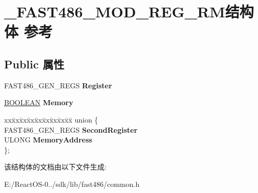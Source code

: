 \hypertarget{struct___f_a_s_t486___m_o_d___r_e_g___r_m}{}\section{\+\_\+\+F\+A\+S\+T486\+\_\+\+M\+O\+D\+\_\+\+R\+E\+G\+\_\+\+R\+M结构体 参考}
\label{struct___f_a_s_t486___m_o_d___r_e_g___r_m}
\subsection*{Public 属性}
\begin{DoxyCompactItemize}
\item 
\mbox{\label{struct___f_a_s_t486___m_o_d___r_e_g___r_m_ae573f7f184f6440b62412ac6b8cd9d80}} 
F\+A\+S\+T486\+\_\+\+G\+E\+N\+\_\+\+R\+E\+GS {\bfseries Register}
\item 
\mbox{\label{struct___f_a_s_t486___m_o_d___r_e_g___r_m_ada79218dde1f45e5a38a2b980972b99c}} 
\hyperlink{_processor_bind_8h_a112e3146cb38b6ee95e64d85842e380a}{B\+O\+O\+L\+E\+AN} {\bfseries Memory}
\item 
\mbox{\label{struct___f_a_s_t486___m_o_d___r_e_g___r_m_a138eb4493740a9b97d6c4de4209033de}} 
\begin{tabbing}
xx\=xx\=xx\=xx\=xx\=xx\=xx\=xx\=xx\=\kill
union \{\\
\>FAST486\_GEN\_REGS {\bfseries SecondRegister}\\
\>ULONG {\bfseries MemoryAddress}\\
\}; \\

\end{tabbing}\end{DoxyCompactItemize}


该结构体的文档由以下文件生成\+:\begin{DoxyCompactItemize}
\item 
E\+:/\+React\+O\+S-\/0../sdk/lib/fast486/common.\+h\end{DoxyCompactItemize}

